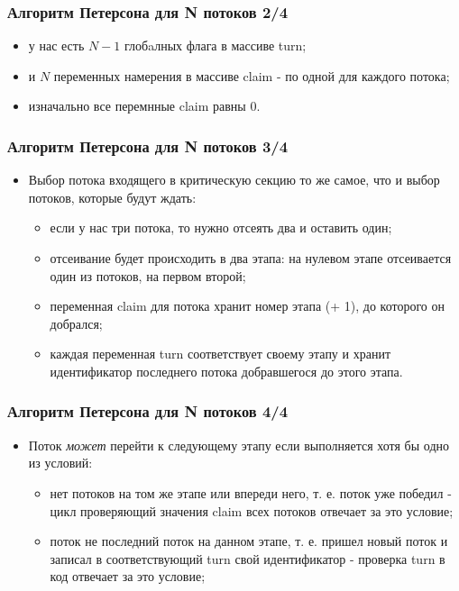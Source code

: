 \begin{frame}
\frametitle{Алгоритм Петерсона для N потоков 2/4}
\begin{itemize}
  \item у нас есть $N - 1$ глобaлных флага в массиве turn;
  \item и $N$ переменных намерения в массиве claim - по одной для каждого
  потока;
  \item изначально все перемнные claim равны 0.
\end{itemize}
\end{frame}

\begin{frame}
\frametitle{Алгоритм Петерсона для N потоков 3/4}
\begin{itemize}
  \item Выбор потока входящего в критическую секцию то же самое, что и выбор
  потоков, которые будут ждать:
  \begin{itemize}
    \item если у нас три потока, то нужно отсеять два и оставить один;
    \item отсеивание будет происходить в два этапа: на нулевом этапе отсеивается
    один из потоков, на первом второй;
    \item переменная claim для потока хранит номер этапа (+ 1), до которого он
    добрался;
    \item каждая переменная turn соответствует своему этапу и хранит
    идентификатор последнего потока добравшегося до этого этапа.
  \end{itemize}
\end{itemize}
\end{frame}

\begin{frame}
\frametitle{Алгоритм Петерсона для N потоков 4/4}
\begin{itemize}
  \item Поток \emph{может} перейти к следующему этапу если выполняется хотя бы
  одно из условий:
  \begin{itemize}
    \item нет потоков на том же этапе или впереди него, т. е. поток уже
    победил - цикл проверяющий значения claim всех потоков отвечает за это
    условие;
    \item поток не последний поток на данном этапе, т. е. пришел новый поток
    и записал в соответствующий turn свой идентификатор - проверка turn в код
    отвечает за это условие;
  \end{itemize}
\end{itemize}
\end{frame}

